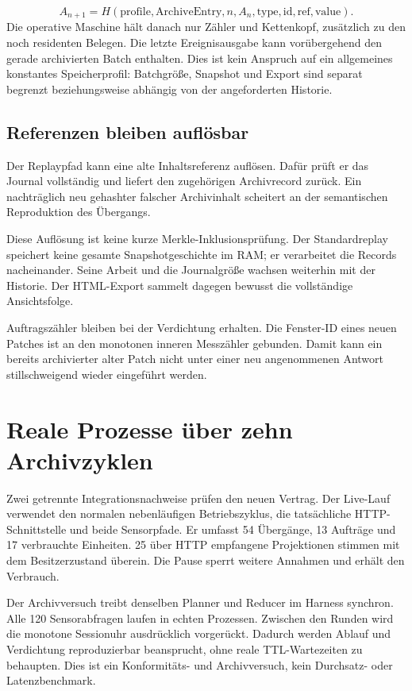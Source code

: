 \documentclass[11pt,a4paper]{article}
\newcommand{\nextsection}[2]{\clearpage{\color{accent}\small\textsf{#1}}\section{#2}}
\begin{document}
\[
A_{n+1}=H(\mathrm{profile},\mathrm{ArchiveEntry},
           n,A_n,\mathrm{type},\mathrm{id},\mathrm{ref},\mathrm{value}).
\]
Die operative Maschine hält danach nur Zähler und Kettenkopf,
zusätzlich zu den noch residenten Belegen. Die letzte Ereignisausgabe
kann vorübergehend den gerade archivierten Batch enthalten. Dies
ist kein Anspruch auf ein allgemeines konstantes Speicherprofil:
Batchgröße, Snapshot und Export sind separat begrenzt beziehungsweise
abhängig von der angeforderten Historie.

\subsection{Referenzen bleiben auflösbar}
Der Replaypfad kann eine alte Inhaltsreferenz auflösen. Dafür prüft
er das Journal vollständig und liefert den zugehörigen Archivrecord
zurück. Ein nachträglich neu gehashter falscher Archivinhalt scheitert
an der semantischen Reproduktion des Übergangs.

Diese Auflösung ist keine kurze Merkle-Inklusionsprüfung. Der
Standardreplay speichert keine gesamte Snapshotgeschichte im RAM;
er verarbeitet die Records nacheinander. Seine Arbeit und die
Journalgröße wachsen weiterhin mit der Historie. Der HTML-Export
sammelt dagegen bewusst die vollständige Ansichtsfolge.

Auftragszähler bleiben bei der Verdichtung erhalten. Die Fenster-ID
eines neuen Patches ist an den monotonen inneren Messzähler gebunden.
Damit kann ein bereits archivierter alter Patch nicht unter einer
neu angenommenen Antwort stillschweigend wieder eingeführt werden.

\nextsection{41 / GEMISCHTER NACHWEIS}{Reale Prozesse über zehn Archivzyklen}
Zwei getrennte Integrationsnachweise prüfen den neuen Vertrag.
Der Live-Lauf verwendet den normalen nebenläufigen Betriebszyklus,
die tatsächliche HTTP-Schnittstelle und beide Sensorpfade. Er umfasst
54 Übergänge, 13 Aufträge und 17 verbrauchte Einheiten. 25 über HTTP
empfangene Projektionen stimmen mit dem Besitzerzustand überein.
Die Pause sperrt weitere Annahmen und erhält den Verbrauch.

Der Archivversuch treibt denselben Planner und Reducer im Harness
synchron. Alle 120 Sensorabfragen laufen in echten Prozessen.
Zwischen den Runden wird die monotone Sessionuhr ausdrücklich
vorgerückt. Dadurch werden Ablauf und Verdichtung reproduzierbar
beansprucht, ohne reale TTL-Wartezeiten zu behaupten. Dies ist ein
Konformitäts- und Archivversuch, kein Durchsatz- oder Latenzbenchmark.
\end{document}
